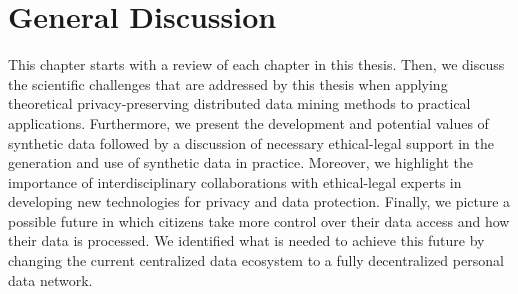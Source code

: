 \chapter{General Discussion}
\clearpage
\begin{refsection}
This chapter starts with a review of each chapter in this thesis. Then, we discuss the scientific challenges that are addressed by this thesis when applying theoretical privacy-preserving distributed data mining methods to practical applications. Furthermore, we present the development and potential values of synthetic data followed by a discussion of necessary ethical-legal support in the generation and use of synthetic data in practice. Moreover, we highlight the importance of interdisciplinary collaborations with ethical-legal experts in developing new technologies for privacy and data protection. Finally, we picture a possible future in which citizens take more control over their data access and how their data is processed. We identified what is needed to achieve this future by changing the current centralized data ecosystem to a fully decentralized personal data network. 


\end{refsection}